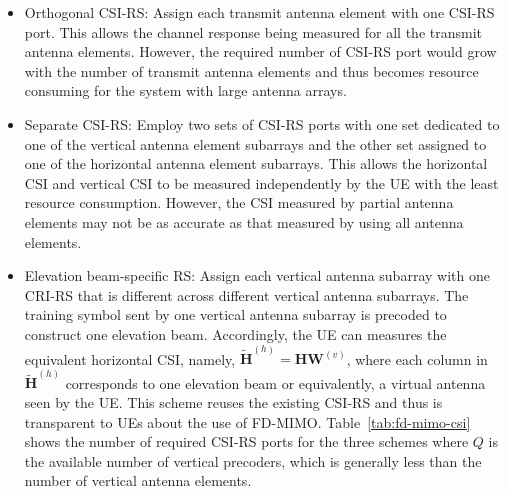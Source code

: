 \documentclass[a4paper,12pt]{article}%
\begin{document}
{%

\begin{itemize}
\item Orthogonal CSI-RS: Assign each transmit antenna element with one CSI-RS port. This allows the channel response being measured for all the transmit antenna elements. However, the required number of CSI-RS port would grow with the number of transmit antenna elements and thus becomes resource consuming for the system with large antenna arrays.
\item Separate CSI-RS: Employ two sets of CSI-RS ports with one set dedicated to one of the vertical antenna element subarrays and the other set assigned to one of the horizontal antenna element subarrays. This allows the horizontal CSI and vertical CSI to be measured independently by the UE with the least resource consumption. However, the CSI measured by partial antenna elements may not be as accurate as that measured by using all antenna elements.
\item Elevation beam-specific RS: Assign each vertical antenna subarray with one CRI-RS that is different across different vertical antenna subarrays. The training symbol sent by one vertical antenna subarray is precoded to construct one elevation beam. Accordingly, the UE can measures the equivalent horizontal CSI, namely, $\tilde{\mathbf{H}}^{(h)} = \mathbf{H} \mathbf{W}^{(v)}$,  where each column in $\tilde{\mathbf{H}}^{(h)}$ corresponds to one elevation beam or equivalently, a virtual antenna seen by the UE. This scheme reuses the existing CSI-RS and thus is transparent to UEs about the use of FD-MIMO. Table~\ref{tab:fd-mimo-csi} shows the number of required CSI-RS ports for the three schemes where $Q$ is the available number of vertical precoders, which is generally less than the number of vertical antenna elements.
\end{itemize}

}
\end{document}
